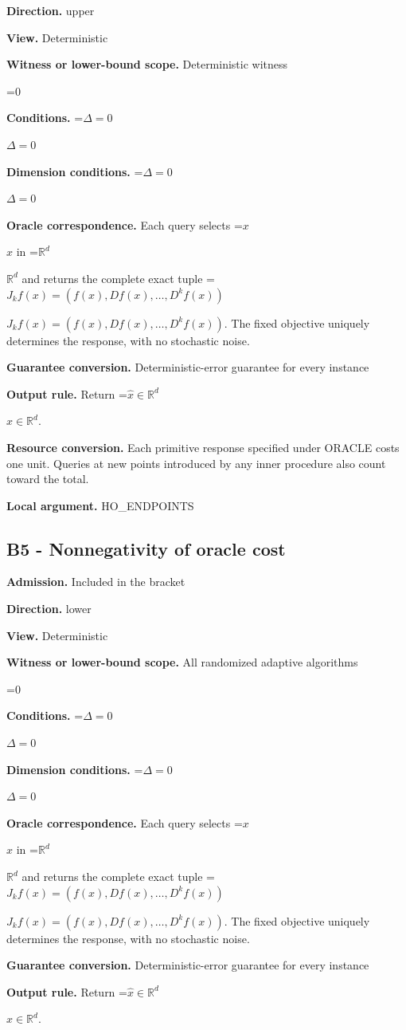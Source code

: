 \documentclass[10pt,a4paper]{article}
\newcommand{\AtlasMath}[1]{\par\begingroup\centering\setbox0=\hbox{$\displaystyle #1$}\ifdim\wd0>1.4\linewidth\typeout{ATLAS WIDE FORMULA: \the\wd0}\fi\ifdim\wd0>\linewidth\resizebox{\linewidth}{!}{\box0}\else\box0\fi\par\endgroup}
\newcommand{\AtlasInlineMath}[1]{\begingroup\setbox0=\hbox{$#1$}\ifdim\wd0>.4\linewidth\endgroup\AtlasMath{#1}\else\endgroup$#1$\fi}
\begin{document}
\textbf{Direction.} upper

\textbf{View.} Deterministic

\textbf{Witness or lower-bound scope.} Deterministic witness

\AtlasMath{0}
\textbf{Conditions.} \AtlasInlineMath{\Delta=0}

\textbf{Dimension conditions.} \AtlasInlineMath{\Delta=0}

\textbf{Oracle correspondence.} Each query selects \AtlasInlineMath{x} in \AtlasInlineMath{\mathbb{R}^d} and returns the complete exact tuple \AtlasInlineMath{J_{k}f(x)=(f(x),Df(x),\ldots,D^{k}f(x))}. The fixed objective uniquely determines the response, with no stochastic noise.

\textbf{Guarantee conversion.} Deterministic-error guarantee for every instance

\textbf{Output rule.} Return \AtlasInlineMath{\widehat{x}\in \mathbb{R}^d}.

\textbf{Resource conversion.} Each primitive response specified under ORACLE costs one unit. Queries at new points introduced by any inner procedure also count toward the total.

\textbf{Local argument.} HO\_\allowbreak{}ENDPOINTS

\subsection{B5 - Nonnegativity of oracle cost}
\textbf{Admission.} Included in the bracket

\textbf{Direction.} lower

\textbf{View.} Deterministic

\textbf{Witness or lower-bound scope.} All randomized adaptive algorithms

\AtlasMath{0}
\textbf{Conditions.} \AtlasInlineMath{\Delta=0}

\textbf{Dimension conditions.} \AtlasInlineMath{\Delta=0}

\textbf{Oracle correspondence.} Each query selects \AtlasInlineMath{x} in \AtlasInlineMath{\mathbb{R}^d} and returns the complete exact tuple \AtlasInlineMath{J_{k}f(x)=(f(x),Df(x),\ldots,D^{k}f(x))}. The fixed objective uniquely determines the response, with no stochastic noise.

\textbf{Guarantee conversion.} Deterministic-error guarantee for every instance

\textbf{Output rule.} Return \AtlasInlineMath{\widehat{x}\in \mathbb{R}^d}.
\end{document}
